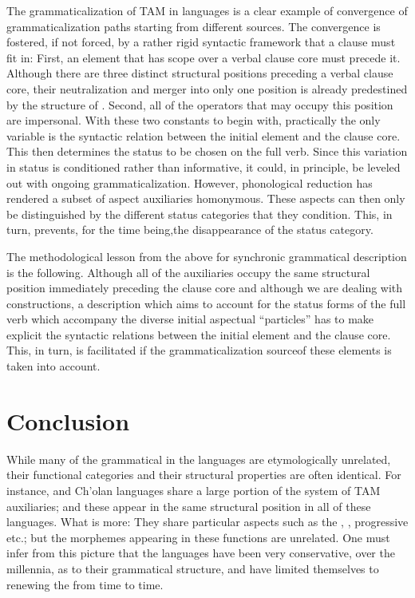 \documentclass[output=paper]{langsci/langscibook}
\begin{document}
The grammaticalization of TAM in  languages is a clear example of convergence of grammaticalization paths starting from different sources. The convergence is fostered, if not forced, by a rather rigid syntactic framework that a clause must fit in: First,  an element that has scope over a verbal clause core must precede it. Although there are three distinct structural positions preceding a verbal clause core, their neutralization and merger into only one position is already predestined by the structure of . Second, all of the operators that may occupy this position are impersonal. With these two constants to begin with, practically the only variable is the syntactic relation between the initial element and the clause core. This then determines the status to be chosen on the full verb. Since this variation in status is conditioned rather than informative, it could, in principle, be leveled out with ongoing grammaticalization. However, phonological reduction has rendered a subset of aspect auxiliaries homonymous. These aspects can then only be distinguished by the different status categories that they condition. This, in turn, prevents, for the time being,\largerpage the disappearance of the status category.

The methodological lesson from the above for synchronic grammatical description is the following. Although all of the auxiliaries occupy the same structural position immediately preceding the clause core and although we are dealing with  constructions, a description which aims to account for the status forms of the full verb which accompany the diverse initial aspectual “particles” has to make explicit the syntactic relations between the initial element and the clause core. This, in turn, is facilitated if the grammaticalization source\largerpage of these elements is taken into account.

\section{Conclusion}\label{sec:lehmann:5}
While many of the grammatical  in the  languages are etymologically unrelated, their functional categories and their structural properties are often identical. For instance,  and Ch'olan languages share a large portion of the system of TAM auxiliaries; and these appear in the same structural position in all of these languages. What is more: They share particular aspects such as the , , progressive etc.; but the morphemes appearing in these functions are unrelated. One must infer from this picture that the  languages have been very conservative, over the millennia, as to their grammatical structure, and have limited themselves to renewing the  from time to time.
\end{document}
